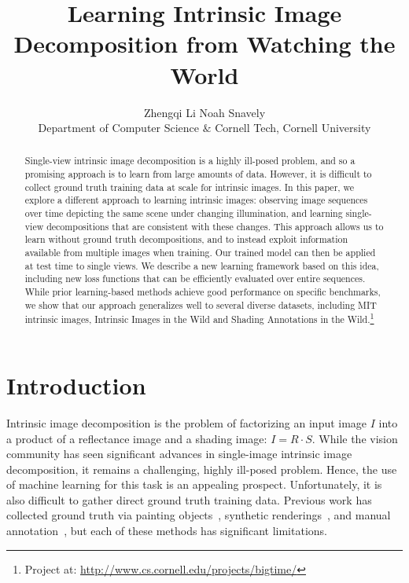 \documentclass[10pt,twocolumn,letterpaper]{article}
\begin{document}
\title{Learning Intrinsic Image Decomposition from Watching the World}

\author{Zhengqi Li \qquad Noah Snavely \\
Department of Computer Science $\&$ Cornell Tech, Cornell University}


\maketitle

\begin{abstract}
Single-view intrinsic image decomposition is a highly ill-posed
problem, and so a promising approach is to learn from large amounts of
data. However, it is difficult to collect ground truth training data
at scale for intrinsic images. In this paper, we explore a different
approach to learning intrinsic images: observing image sequences over
time depicting the same scene under changing illumination, and
learning single-view decompositions that are consistent with these
changes. This approach allows us to learn without ground truth
decompositions, and to instead exploit information available from
multiple images when training. Our trained model can then be applied
at test time to single views. We describe a new learning framework
based on this idea, including new loss functions that can be
efficiently evaluated over entire sequences. While prior
learning-based
methods achieve good performance on
specific benchmarks, we show that our approach generalizes well to
several diverse datasets, including MIT intrinsic images, Intrinsic
Images in the Wild and Shading Annotations in the
Wild.\footnote{Project at: {\scriptsize
    \url{http://www.cs.cornell.edu/projects/bigtime/}}}
\end{abstract}

\section{Introduction}Intrinsic image decomposition is the problem of factorizing an input
image $I$ into a product of a reflectance image and a shading image: $I
= R \cdot S$.
While the vision community has seen significant advances in
single-image intrinsic image decomposition, it remains a challenging,
highly ill-posed problem. Hence, the use of machine learning for this task is an appealing prospect. Unfortunately, it is also difficult to gather direct ground
truth training data. Previous work has collected ground truth via
painting objects~\cite{grosse2009ground}, synthetic
renderings~\cite{Butler:ECCV:2012, chang2015shapenet}, and manual
annotation~\cite{bell2014intrinsic,kovacs2017shading}, but each of
these methods has significant limitations.
\end{document}
